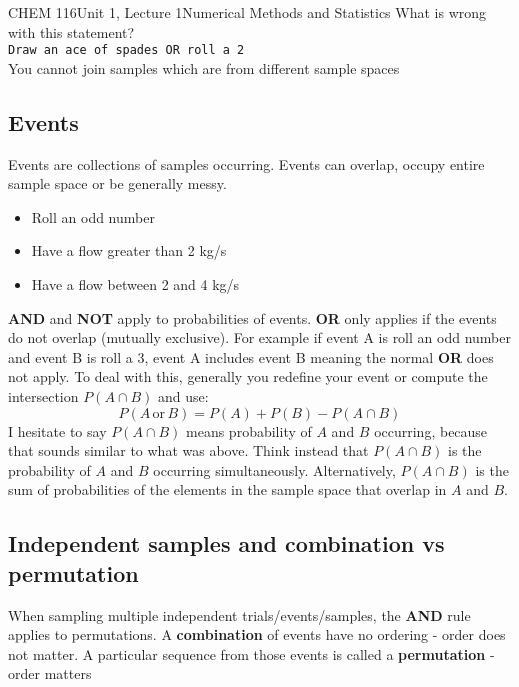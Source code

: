 \documentclass{article}
\begin{document}
\begin{tdoc}{CHEM 116}{Unit 1, Lecture 1}{Numerical Methods and Statistics}
What is wrong with this statement? \vspace{0.2cm}\\

\texttt{Draw an ace of spades OR roll a 2}\vspace{0.2cm}\\

You cannot join samples which are from different sample spaces

\subsection{Events}

Events are collections of samples occurring. Events can overlap, occupy
entire sample space or be generally messy.

\begin{itemize}

\item Roll an odd number
\item Have a flow greater than 2 kg/s
\item Have a flow between 2 and 4 kg/s

\end{itemize}
\vspace{0.5cm}

{\bf AND} and {\bf NOT} apply to probabilities of events. {\bf OR}
only applies if the events do not overlap (mutually exclusive). For
example if event A is roll an odd number and event B is roll a 3,
event A includes event B meaning the normal {\bf OR} does not
apply. To deal with this, generally you redefine your event or
compute the intersection $P(A\cap B)$ and use:
\begin{equation}
P(A\,\textrm{or}\,B) = P(A) + P(B) - P(A \cap B)
\end{equation}
I hesitate to say $P(A \cap B)$ means probability of $A$ and $B$
occurring, because that sounds similar to what was above. Think
instead that $P(A \cap B)$ is the probability of $A$ and $B$ occurring
simultaneously. Alternatively, $P(A \cap B)$ is the sum of
probabilities of the elements in the sample space that overlap in $A$
and $B$.

\subsection{Independent samples and combination vs permutation}

When sampling multiple independent trials/events/samples, the {\bf
  AND} rule applies to permutations. A {\bf combination} of events
have no ordering - order does not matter. A particular sequence from
those events is called a {\bf permutation} - order
matters\vspace{0.2cm}


\end{tdoc}
\end{document}
